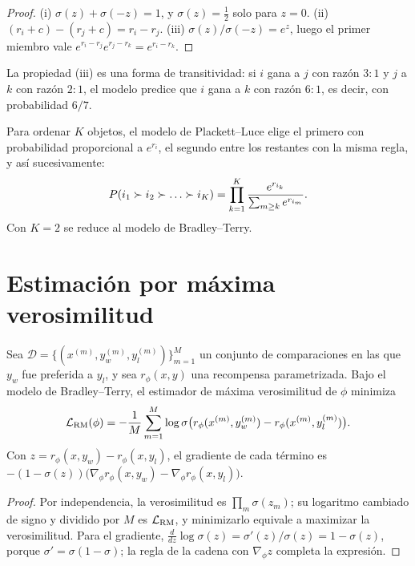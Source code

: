 \begin{proof}
(i) $\sigma(z)+\sigma(-z)=1$, y $\sigma(z)=\tfrac12$ solo para $z=0$. (ii) $(r_i+c)-(r_j+c)=r_i-r_j$. (iii) $\sigma(z)/\sigma(-z)=e^{z}$, luego el primer miembro vale $e^{r_i-r_j}e^{r_j-r_k}=e^{r_i-r_k}$.
\end{proof}

La propiedad (iii) es una forma de transitividad: si $i$ gana a $j$ con razón $3{:}1$ y $j$ a $k$ con razón $2{:}1$, el modelo predice que $i$ gana a $k$ con razón $6{:}1$, es decir, con probabilidad $6/7$.

\begin{definicion}\label{def:pl}
Para ordenar $K$ objetos, el modelo de Plackett--Luce elige el primero con probabilidad proporcional a $e^{r_i}$, el segundo entre los restantes con la misma regla, y así sucesivamente:
\[
P(i_1\pref i_2\pref\dots\pref i_K)=\prod_{k=1}^{K}\frac{e^{r_{i_k}}}{\sum_{m\ge k}e^{r_{i_m}}}.
\]
Con $K=2$ se reduce al modelo de Bradley--Terry.
\end{definicion}

\section{Estimación por máxima verosimilitud}

\begin{proposicion}\label{prop:bt-mv}
Sea $\mathcal{D}=\{(x^{(m)},y_w^{(m)},y_l^{(m)})\}_{m=1}^{M}$ un conjunto de comparaciones en las que $y_w$ fue preferida a $y_l$, y sea $r_\phi(x,y)$ una recompensa parametrizada. Bajo el modelo de Bradley--Terry, el estimador de máxima verosimilitud de $\phi$ minimiza
\[
\mathcal{L}_{\mathrm{RM}}(\phi)=-\frac1M\sum_{m=1}^{M}\log\sigma\bigl(r_\phi(x^{(m)},y_w^{(m)})-r_\phi(x^{(m)},y_l^{(m)})\bigr).
\]
Con $z=r_\phi(x,y_w)-r_\phi(x,y_l)$, el gradiente de cada término es $-(1-\sigma(z))\bigl(\nabla_\phi r_\phi(x,y_w)-\nabla_\phi r_\phi(x,y_l)\bigr)$.
\end{proposicion}

\begin{proof}
Por independencia, la verosimilitud es $\prod_m\sigma(z_m)$; su logaritmo cambiado de signo y dividido por $M$ es $\mathcal{L}_{\mathrm{RM}}$, y minimizarlo equivale a maximizar la verosimilitud. Para el gradiente, $\frac{d}{dz}\log\sigma(z)=\sigma'(z)/\sigma(z)=1-\sigma(z)$, porque $\sigma'=\sigma(1-\sigma)$; la regla de la cadena con $\nabla_\phi z$ completa la expresión.
\end{proof}

